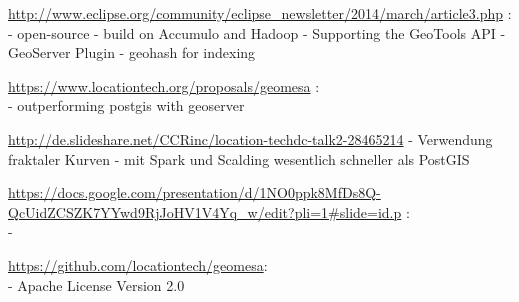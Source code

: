 \url{http://www.eclipse.org/community/eclipse_newsletter/2014/march/article3.php} :\\
- open-source
- build on Accumulo and Hadoop
- Supporting the GeoTools API
- GeoServer Plugin
- geohash for indexing


\url{https://www.locationtech.org/proposals/geomesa} :\\
- outperforming postgis with geoserver


\url{http://de.slideshare.net/CCRinc/location-techdc-talk2-28465214}
- Verwendung fraktaler Kurven
- mit Spark und Scalding wesentlich schneller als PostGIS


\url{https://docs.google.com/presentation/d/1NO0ppk8MfDs8Q-QcUidZCSZK7YYwd9RjJoHV1V4Yq_w/edit?pli=1#slide=id.p} :\\
- 



\url{https://github.com/locationtech/geomesa}:\\
- Apache License Version 2.0


